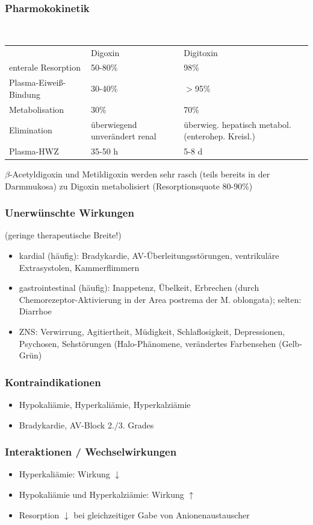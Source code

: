 \documentclass[10pt,a4paper]{report}
\begin{document}
\subsubsection{Pharmokokinetik} \mbox{} \\
\begin{tabularx}{\textwidth}{XXX}
&Digoxin&Digitoxin\\
enterale Resorption	&50-80\%&98\%\\
Plasma-Eiweiß-Bindung&30-40\%&$>$95\%\\
Metabolisation&30\%&70\%\\
Elimination&überwiegend unverändert renal&überwieg. hepatisch metabol. (enterohep. Kreisl.) \\
Plasma-HWZ&35-50 h&5-8 d\\
\end{tabularx}
$\beta$-Acetyldigoxin und Metildigoxin werden sehr rasch (teils bereits in der Darmmukosa) zu Digoxin metabolisiert (Resorptionsquote 80-90\%)
\subsubsection{Unerwünschte Wirkungen} (geringe therapeutische Breite!)
\begin{itemize}
	\item kardial (häufig): Bradykardie, AV-Überleitungsstörungen, ventrikuläre Extrasystolen, Kammerflimmern
 	\item gastrointestinal (häufig): Inappetenz, Übelkeit, Erbrechen (durch Chemorezeptor-Aktivierung in der Area postrema der M. oblongata); selten: Diarrhoe
	\item ZNS: Verwirrung, Agitiertheit, Müdigkeit, Schlaflosigkeit, Depressionen, Psychosen, Sehstörungen (Halo-Phänomene, verändertes Farbensehen (Gelb-Grün)
\end{itemize}
\subsubsection{Kontraindikationen}
\begin{itemize}
	\item Hypokaliämie, Hyperkaliämie, Hyperkalziämie
	\item Bradykardie, AV-Block 2./3. Grades
\end{itemize}
\subsubsection{Interaktionen / Wechselwirkungen}
\begin{itemize}
	\item Hyperkaliämie: Wirkung $\downarrow$
	\item Hypokaliämie und Hyperkalziämie: Wirkung $\uparrow$
	\item Resorption $\downarrow$ bei gleichzeitiger Gabe von Anionenaustauscher 
\end{itemize}
\end{document}
